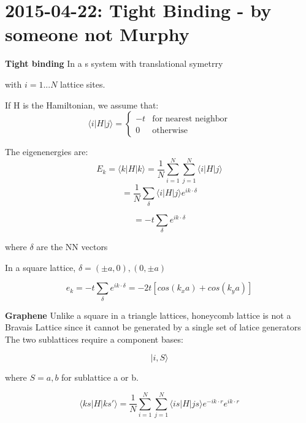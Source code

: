 \documentclass[english, 11pt]{article}
\begin{document}
		\pagebreak
		\section{2015-04-22: Tight Binding - by someone not Murphy}
			\textbf{Tight binding}
			In a s system with translational symetrry
			
			
			with $i=1...N$ lattice sites.
			
			If H is the Hamiltonian, we assume that:
			\begin{equation}
				\langle i | H | j \rangle = \begin{cases} -t & \text{for nearest neighbor} \\   0 & \text{otherwise} \end{cases}
			\end{equation}
			
			The eigenenergies are:
			\begin{equation}
				E_k = \langle k |H | k\rangle  = \frac{1}{N} \sum_{i=1}^N \sum_{j=1}^N \langle i | H | j \rangle 
			\end{equation}
			\begin{equation}
				= \frac{1}{N} \sum_{\delta}\langle i |H|j\rangle e^{ik\cdot \delta}
			\end{equation}
			
			\begin{equation}
				= -t \sum_{\delta}  e^{ik\cdot \delta}
			\end{equation}
			
			where $\delta$ are the NN vectors
			
			In a square lattice,
			$\delta = (\pm a,0),(0, \pm a)$
			
			 \begin{equation}
			 	e_k = -t \sum_\delta e^{i k \cdot \delta} = -2t[cos(k_x a) + cos(k_y a)]
			 \end{equation} 
	
	
		\textbf{Graphene}
		Unlike a square in a triangle lattices, honeycomb lattice is not a Bravais Lattice since it cannot be generated by a single set of latice generators
		The two sublattices require a component bases:
			
			\begin{equation}
				|i, S \rangle
			\end{equation}
			
			where $S=a,b$ for sublattice a or b.
			
			
			\begin{equation}
				\langle k s |H| k s' \rangle=   \frac{1}{N} \sum_{i=1}^N \sum_{j=1}^N \langle i s | H | j s \rangle  e^{-i k \cdot r}e^{i k \cdot r}
			\end{equation}
			
\end{document}
